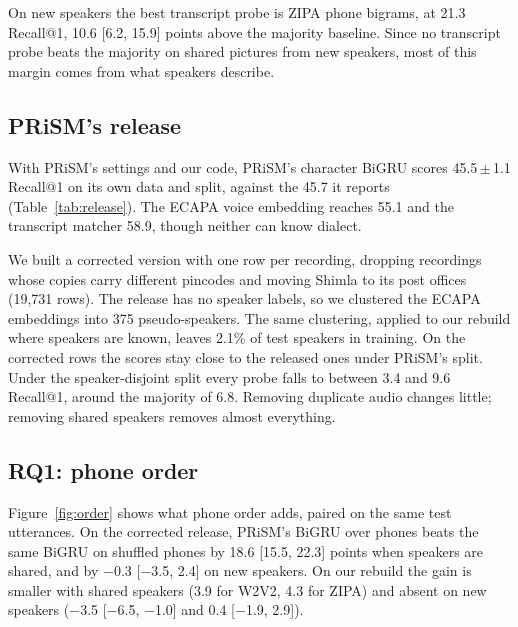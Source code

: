 \documentclass[11pt]{article}
\begin{document}
On new speakers the best transcript probe is ZIPA phone bigrams, at 21.3 Recall@1, 10.6 [6.2, 15.9] points above
the majority baseline. Since no transcript probe beats the majority on shared pictures from new speakers, most of this margin comes
from what speakers describe.

\begin{table}[t]
\centering\small
\begin{minipage}{0.8\textwidth}

\caption{Test Recall@1 on PRiSM's release (mean $\pm$ sd over seeds). The first column uses the data and split as
released, the second the corrected rows under PRiSM's split, and the third the corrected rows with new speakers,
found by clustering voices. The corrected rows keep one row per recording, drop conflicting labels and put Shimla
at its post offices.}
\label{tab:release}
\end{minipage}
\end{table}

\subsection{PRiSM's release}
With PRiSM's settings and our code, PRiSM's character BiGRU scores 45.5\,$\pm$\,1.1 Recall@1 on its own data and
split, against the 45.7 it reports (Table~\ref{tab:release}). The ECAPA voice
embedding reaches 55.1 and the transcript matcher 58.9, though neither can know dialect.

We built a corrected version with one row per recording, dropping recordings whose copies carry different
pincodes and moving Shimla to its post offices (19,731 rows). The release has no speaker labels, so we clustered
the ECAPA embeddings into 375 pseudo-speakers. The same clustering, applied to our rebuild where speakers are
known, leaves 2.1\% of test speakers in training. On the corrected rows the scores stay close to the released
ones under PRiSM's split. Under the speaker-disjoint split every probe falls to between 3.4 and 9.6 Recall@1,
around the majority of 6.8. Removing duplicate audio changes little; removing shared speakers removes almost
everything.


\subsection{RQ1: phone order}
Figure~\ref{fig:order} shows what phone order adds, paired on the same test utterances. On the corrected release,
PRiSM's BiGRU over phones beats the same BiGRU on shuffled phones by 18.6 [15.5, 22.3] points when speakers are
shared, and by $-$0.3 [$-$3.5, 2.4] on new speakers. On our rebuild the gain is smaller with shared speakers
(3.9 for W2V2, 4.3 for ZIPA) and absent on new speakers ($-$3.5 [$-$6.5, $-$1.0] and 0.4 [$-$1.9, 2.9]).
\end{document}
